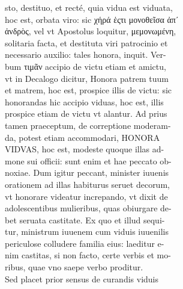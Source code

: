 \documentclass{article}
\begin{document}
\begin{pages}
                sto, destituo, et recté, quia vidua est viduata, \\
                hoc est, orbata viro: sic χήρά ἑςτι  μονοθεῖσα ἀπʹ \\
                ἀνδρὸς, vel vt Apostolus loquitur, μεμονωμένη, \\
                solitaria facta, et destituta viri patrocinio et \\
                necessario auxilio: tales honora, inquit. Ver- \\
                bum τιμᾶν accipio de victu etiam et amictu, \\
                vt in Decalogo dicitur, Honora patrem tuum \\
                et matrem, hoc est, prospice illis de victu: sic \\
                honorandas hic accipio viduas, hoc est, illis \\
                prospice etiam de victu vt alantur. Ad prius \\
                tamen praeceptum, de correptione moderam- \\
                da, potest etiam accommodari, HONORA \\
                VIDVAS, hoc est, modeste quoque illas ad- \\
                mone sui officii: sunt enim et hae peccato ob- \\
                noxiae. Dum igitur peccant, minister iuuenis \\
                orationem ad illas habiturus seruet decorum, \\
                vt honorare videatur increpando, vt dixit de \\
                adolescentibus mulieribus, quas obiurgare de- \\
                bet seruata castitate. Ex quo et illud sequi- \\
                tur, ministrum iuuenem cum viduis iuuenilis \\
                periculose colludere familia eius: laeditur e- \\
                nim castitas, si non facto, certe verbis et mo- \\
                ribus, quae vno saepe verbo proditur. \\
                Sed placet prior sensus de curandis viduis \\

\end{pages}
\end{document}
